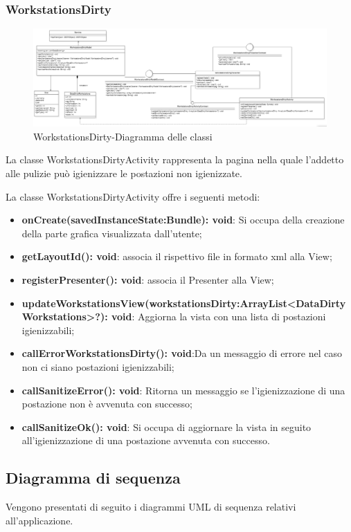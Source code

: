 \subsubsection{WorkstationsDirty}
\begin{figure}[H]
	\centering
	\includegraphics[width=16cm]{res/images/WorkstationsDirty.png}
	\caption{WorkstationsDirty-Diagramma delle classi}
	\label{fig:WorkstationsDirty-Diagramma delle classi}
\end{figure}
La classe WorkstationsDirtyActivity rappresenta la pagina nella quale l'addetto alle pulizie può igienizzare le postazioni non igienizzate.

La classe WorkstationsDirtyActivity offre i seguenti metodi:
\begin{itemize}
	\item \textbf{onCreate(savedInstanceState:Bundle): void}: Si occupa della creazione della parte grafica visualizzata dall'utente; 
	\item \textbf{getLayoutId(): void}: associa il rispettivo file in formato xml alla View;
	\item \textbf{registerPresenter(): void}: associa il Presenter alla View; 
	\item \textbf{updateWorkstationsView(workstationsDirty:ArrayList<DataDirtyWorkstations>?): void}: Aggiorna la vista con una lista di postazioni igienizzabili; 
	\item \textbf{callErrorWorkstationsDirty(): void}:Da un messaggio di errore nel caso non ci siano postazioni igienizzabili;
	\item \textbf{callSanitizeError(): void}:  Ritorna un messaggio se l'igienizzazione di una postazione non è avvenuta con successo; 
	\item \textbf{callSanitizeOk(): void}: Si occupa di aggiornare la vista in seguito all'igienizzazione di una postazione avvenuta con successo.
\end{itemize}

\subsection{Diagramma di sequenza}
Vengono presentati di seguito i diagrammi UML di sequenza relativi all'applicazione.

